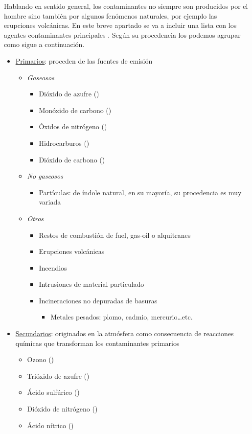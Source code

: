  Hablando en sentido general, los contaminantes no siempre son producidos por el hombre sino también por algunos fenómenos naturales, por ejemplo las erupciones volcánicas. En este breve apartado se va a incluir una lista con los agentes contaminantes principales \cite{_sistema_vigilancia_madrid}. Según su procedencia los podemos agrupar como sigue a continuación.
 
 \begin{itemize}
 	\item \underline{Primarios}: proceden de las fuentes de emisión
 	\begin{itemize}
 		\item \textit{Gaseosos}
 			\begin{itemize}
 				\item 	Dióxido de azufre ()
 				\item 	Monóxido de carbono ()
 				\item 	Óxidos de nitrógeno ()
 				\item 	Hidrocarburos ()
 				\item 	Dióxido de carbono ()
 		    \end{itemize}
 		\item \textit{No gaseosos}
 			\begin{itemize}
 			\item Partículas: de índole  natural, en su mayoría, su procedencia es muy variada
 		   \end{itemize}
 	   	\item \textit{Otros}
 	   \begin{itemize}
 	   	\item 	  Restos de combustión de fuel, gas-oil o alquitranes
 	   	\item 	Erupciones volcánicas
 	   	\item 	Incendios
 	   	\item 	Intrusiones de material particulado
 	   	\item 	 Incineraciones no depuradas de basuras
 	   	\begin{itemize}
 	   		\item Metales pesados: plomo, cadmio, mercurio\ldots etc.
 	   	\end{itemize}
 	   \end{itemize}
 	\end{itemize}
 	\item \underline{Secundarios}: originados en la atmósfera como consecuencia de reacciones químicas que transforman los contaminantes primarios
 	\begin{itemize}
 \item	Ozono ()
 \item	Trióxido de azufre ()
 \item	Ácido sulfúrico ()
 \item	Dióxido de nitrógeno ()
 \item	Ácido nítrico ()
 	\end{itemize}
 \end{itemize}


